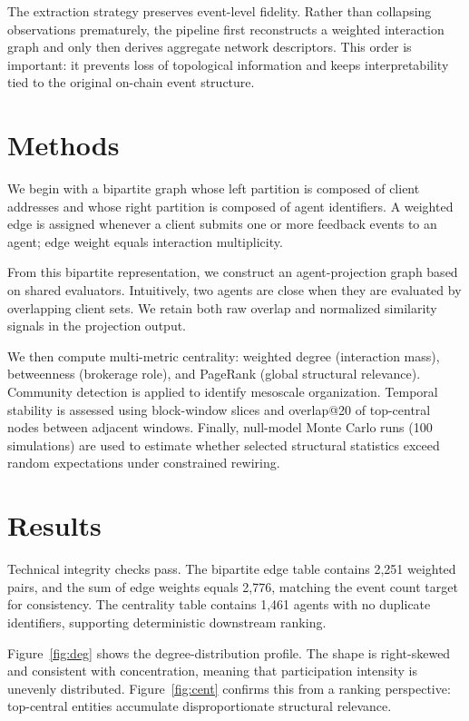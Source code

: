 \documentclass[11pt,a4paper]{article}
\begin{document}
The extraction strategy preserves event-level fidelity. Rather than collapsing observations prematurely, the pipeline first reconstructs a weighted interaction graph and only then derives aggregate network descriptors. This order is important: it prevents loss of topological information and keeps interpretability tied to the original on-chain event structure.

\section{Methods}
We begin with a bipartite graph whose left partition is composed of client addresses and whose right partition is composed of agent identifiers. A weighted edge is assigned whenever a client submits one or more feedback events to an agent; edge weight equals interaction multiplicity.

From this bipartite representation, we construct an agent-projection graph based on shared evaluators. Intuitively, two agents are close when they are evaluated by overlapping client sets. We retain both raw overlap and normalized similarity signals in the projection output.

We then compute multi-metric centrality: weighted degree (interaction mass), betweenness (brokerage role), and PageRank (global structural relevance). Community detection is applied to identify mesoscale organization. Temporal stability is assessed using block-window slices and overlap@20 of top-central nodes between adjacent windows. Finally, null-model Monte Carlo runs (100 simulations) are used to estimate whether selected structural statistics exceed random expectations under constrained rewiring.

\section{Results}
Technical integrity checks pass. The bipartite edge table contains 2,251 weighted pairs, and the sum of edge weights equals 2,776, matching the event count target for consistency. The centrality table contains 1,461 agents with no duplicate identifiers, supporting deterministic downstream ranking.

Figure~\ref{fig:deg} shows the degree-distribution profile. The shape is right-skewed and consistent with concentration, meaning that participation intensity is unevenly distributed. Figure~\ref{fig:cent} confirms this from a ranking perspective: top-central entities accumulate disproportionate structural relevance.
\end{document}
